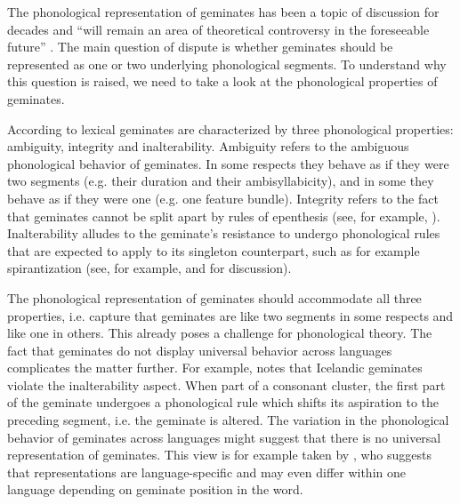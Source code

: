 The phonological representation of geminates has been a topic of discussion for decades and  ``will remain an area of theoretical controversy in the foreseeable future'' \cite[22]{Davis.2011}. The main question of dispute is whether geminates should be represented as one or two underlying phonological segments. To understand why this question is raised, we need to take a look at the phonological properties of geminates. 

According to \cite{Hayes.1986b} lexical geminates are characterized by three phonological properties: ambiguity, integrity and inalterability. Ambiguity refers to the ambiguous phonological behavior of geminates. In some respects they behave as if they were two segments (e.g. their duration and their ambisyllabicity), and in some they behave as if they were one (e.g. one feature bundle). Integrity refers to the fact that geminates  cannot be split apart by rules of epenthesis (see, for example,  \citealt{AbuSalim.,Kenstowicz.1994}).  Inalterability alludes to the geminate's resistance to undergo phonological rules that are expected to apply to its singleton counterpart, such as for example spirantization (see, for example, \citealt {Kenstowicz.1994} and \citealt[chapter 5]{Kirchner.2001} for discussion). 

The phonological representation of geminates should accommodate all three properties, i.e. capture that geminates are like two segments in some respects and like one in others. This already poses a challenge for phonological theory. The fact that geminates do not display universal behavior across languages complicates the matter further. For example, \cite{Kenstowicz.1994} notes that Icelandic geminates violate the inalterability aspect. When part of a consonant cluster, the first part of the geminate undergoes a phonological rule which shifts its aspiration to the preceding segment, i.e. the geminate is altered.
 The variation in the phonological behavior of geminates across languages might suggest that there is no universal representation of geminates.  This view is for example taken by \cite{Ham.2001}, who suggests that representations are language-specific and may even differ within one language depending on geminate position in the word.
 
